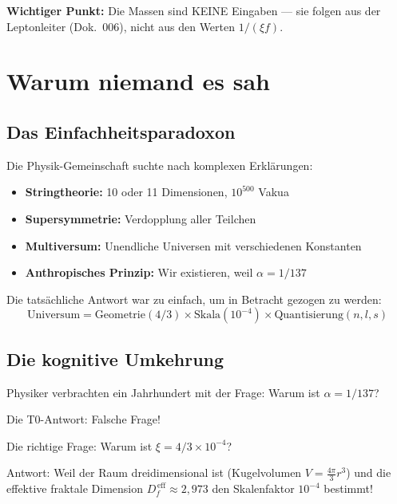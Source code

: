 	\textbf{Wichtiger Punkt:} Die Massen sind KEINE Eingaben — sie folgen aus der Leptonleiter (Dok.~006), nicht aus den Werten $1/(\xi f)$.
	
	\section{Warum niemand es sah}
	
	\subsection{Das Einfachheitsparadoxon}
	
	Die Physik-Gemeinschaft suchte nach komplexen Erklärungen:
	
	\begin{itemize}
		\item \textbf{Stringtheorie:} 10 oder 11 Dimensionen, $10^{500}$ Vakua
		\item \textbf{Supersymmetrie:} Verdopplung aller Teilchen
		\item \textbf{Multiversum:} Unendliche Universen mit verschiedenen Konstanten
		\item \textbf{Anthropisches Prinzip:} Wir existieren, weil $\alpha = 1/137$
	\end{itemize}
	
	Die tatsächliche Antwort war zu einfach, um in Betracht gezogen zu werden:
	\begin{equation}
		\boxed{\text{Universum} = \text{Geometrie}(4/3) \times \text{Skala}(10^{-4}) \times \text{Quantisierung}(n,l,s)}
	\end{equation}
	
	\subsection{Die kognitive Umkehrung}
	
	\begin{tcolorbox}[colback=purple!5!white,colframe=purple!75!black,title=Entdeckung]
		Physiker verbrachten ein Jahrhundert mit der Frage: Warum ist $\alpha = 1/137$?
		
		Die T0-Antwort: Falsche Frage!
		
		Die richtige Frage: Warum ist $\xi = 4/3 \times 10^{-4}$?
		
		Antwort: Weil der Raum dreidimensional ist (Kugelvolumen $V = \frac{4\pi}{3} r^3$) und die effektive fraktale Dimension $D_f^{\,\text{eff}} \approx 2{,}973$ den Skalenfaktor $10^{-4}$ bestimmt!
	\end{tcolorbox}
	
